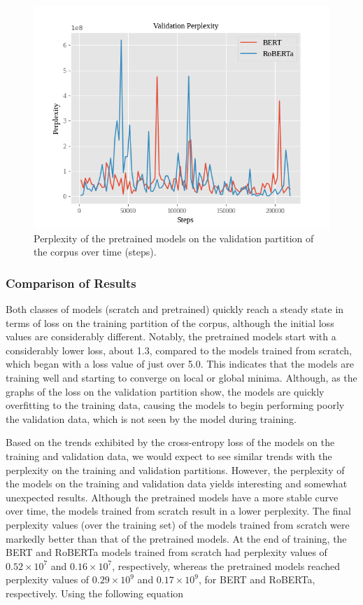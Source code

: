 \documentclass[12pt]{article}
\begin{document}
\begin{figure}[!t]
    \includegraphics[width=\linewidth]{figures/pretrained_validation_ppl.png}
    \caption{Perplexity of the pretrained models on the validation partition of the corpus over time (steps).}
    \label{fig:pretrained_validation_ppl}
\end{figure}

\subsubsection{Comparison of Results}\label{sec:results_comparison}
Both classes of models (scratch and pretrained) quickly reach a steady state in terms of loss on the training partition of the corpus, although the
initial loss values are considerably different. Notably, the pretrained models start with a considerably lower loss, about 1.3, compared to the
models trained from scratch, which began with a loss value of just over 5.0. This indicates that the models are training well and starting to converge
on local or global minima. Although, as the graphs of the loss on the validation partition show, the models are quickly overfitting to the training
data, causing the models to begin performing poorly the validation data, which is not seen by the model during training.

Based on the trends exhibited by the cross-entropy loss of the models on the training and validation data, we would expect to see similar trends with
the perplexity on the training and validation partitions. However, the perplexity of the models on the training and validation data yields interesting
and somewhat unexpected results. Although the pretrained models have a more stable curve over time, the models trained from scratch result in a
lower perplexity. The final perplexity values (over the training set) of the models trained from scratch were markedly better than that
of the pretrained models. At the end of training, the BERT and RoBERTa models trained from scratch had perplexity values of $0.52\times 10^7$ and
$0.16\times 10^7$, respectively, whereas the pretrained models reached perplexity values of $0.29\times 10^9$ and $0.17\times 10^9$, for BERT and
RoBERTa, respectively. Using the following equation
\end{document}
